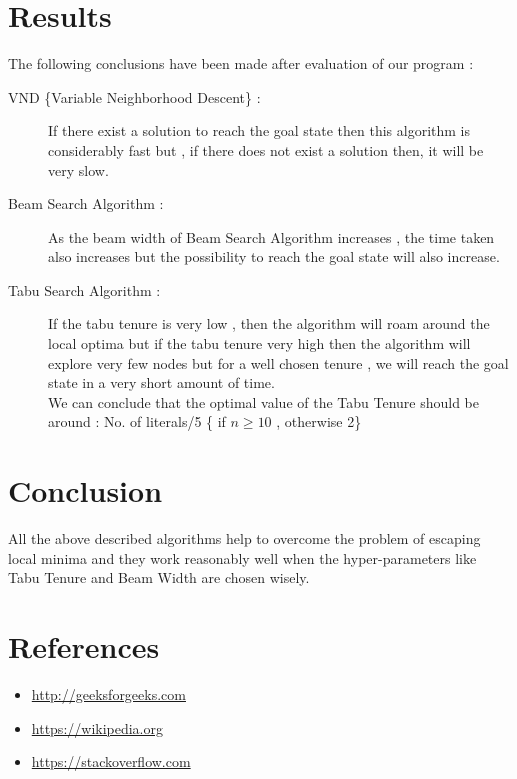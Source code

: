 \documentclass{article}
\begin{document}
\section{Results}
\vspace{20pt}
The following conclusions have been made after evaluation of our program :
\begin{description}
    \item[VND \{Variable Neighborhood Descent\} :] If there exist a solution to reach the goal state then this algorithm is considerably fast 
    but , if there does not exist a solution then, it will be very slow.  
    \item[Beam Search Algorithm :] As the beam width of Beam Search Algorithm increases , the time taken also increases but the possibility to reach the goal state will also increase.
    \item[Tabu Search Algorithm :] If the tabu tenure is very low , then the algorithm will roam around the local optima but if the tabu tenure very high then the algorithm will explore very few nodes
    but for a well chosen tenure , we will reach the goal state in a very short amount of time. 
    \\We can conclude that the optimal value of the Tabu Tenure should be around :
    No. of literals/5 \{ if $n\geq10$ , otherwise 2\}
\end{description}
\section{Conclusion}
All the above described algorithms help to overcome the problem of escaping local minima and
they work reasonably well when the hyper-parameters like Tabu Tenure and Beam Width are chosen wisely. 
\newpage
\section{References}
\vspace{30pt}
\begin{itemize}
    \item \url{http://geeksforgeeks.com}
    \item \url{https://wikipedia.org}
    \item \url{https://stackoverflow.com}
\end{itemize}
\end{document}
